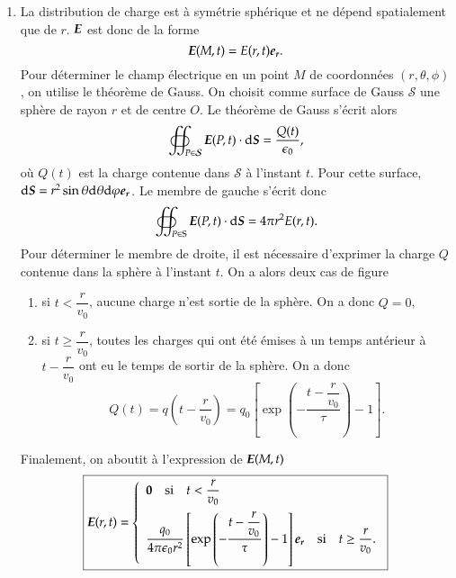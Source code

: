 \begin{corrige}
	\begin{enumerate}
		\item La distribution de charge est à symétrie sphérique et 
		  ne dépend spatialement que de $r$. $\vece$ est donc de la forme
		  \begin{equation*}
			  \vece(M, t) = E(r, t)\er.
		  \end{equation*}
		  Pour déterminer le champ électrique en un point $M$ de 
		  coordonnées $(r, \theta, \phi)$, on utilise le théorème de 
		  Gauss. On choisit comme surface de Gauss $\mathcal{S}$ une sphère de 
		  rayon $r$ et de centre $O$. Le théorème de Gauss s'écrit alors
		  \begin{equation*}
			  \oiint_{P \in \mathcal{S}} \vece(P, t) \cdot \ds 
			  = \dfrac{Q(t)}{\epsilon_0},
		  \end{equation*}
		  où $Q(t)$ est la charge contenue dans $\mathcal{S}$ à l'instant
		  $t$. Pour cette surface, $\ds = r^2 \sin \theta \dtheta \dphi \er$.
		  Le membre de gauche s'écrit donc
		  \begin{equation*}
			  \oiint_{P \in \mathrm{S}} \vece(P, t) \cdot \ds =
			  4 \pi r^2 E(r, t).
		  \end{equation*}
		  Pour déterminer le membre de droite, il est nécessaire d'exprimer
		  la charge $Q$ contenue dans la sphère à l'instant $t$. On a
		  alors deux cas de figure
		  \begin{enumerate}
			  \item si $t < \dfrac{r}{v_0}$, aucune charge n'est 
			    sortie de la sphère. On a donc $Q = 0$,
			  \item si $t \ge \dfrac{r}{v_0}$, toutes les charges
		            qui ont été émises à un temps antérieur à $t -
			    \dfrac{r}{v_0}$ ont eu le temps de sortir de la sphère.
			    On a donc
			    \begin{equation*}
				    Q(t) = q\left(t - \dfrac{r}{v_0} \right)
				      = q_0 \left[\exp\left(- \dfrac{t - 
					      \dfrac{r}{v_0}}{\tau}\right) - 1
					   \right].
			   \end{equation*}
		  \end{enumerate}
		  Finalement, on aboutit à l'expression de $\vece(M, t)$
		  \begin{equation*}
			  \boxed{
			  \vece(r, t) =
			  \left\{
			  \begin{array}{l}
				  \vec{0} \quad \mathrm{si} \quad t < 
				  \dfrac{r}{v_0} \\[1em]
				  \dfrac{q_0}{4 \pi \epsilon_0 r^2}
				  \left[\exp\left(- \dfrac{t - 
			          \dfrac{r}{v_0}}{\tau}\right) - 1 \right]\er
				  \quad \mathrm{si} \quad t \ge \dfrac{r}{v_0}.
		         \end{array}
			 \right.
		 }
		\end{equation*}


\end{enumerate}
\end{corrige}
